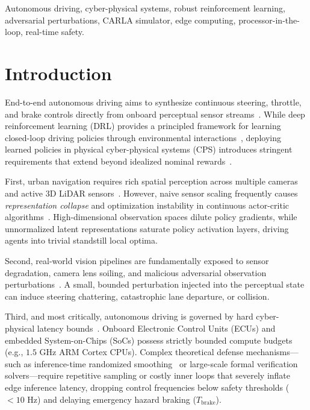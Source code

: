 \documentclass[conference]{IEEEtran}
\begin{document}
\begin{IEEEkeywords}
Autonomous driving, cyber-physical systems, robust reinforcement learning, adversarial perturbations, CARLA simulator, edge computing, processor-in-the-loop, real-time safety.
\end{IEEEkeywords}

\section{Introduction}

End-to-end autonomous driving aims to synthesize continuous steering, throttle, and brake controls directly from onboard perceptual sensor streams~\cite{pomerleau1988, bojarski2016, codevilla2018}. While deep reinforcement learning (DRL) provides a principled framework for learning closed-loop driving policies through environmental interactions~\cite{carla2017, toromanoff2020}, deploying learned policies in physical cyber-physical systems (CPS) introduces stringent requirements that extend beyond idealized nominal rewards~\cite{he2024trustworthy}.

First, urban navigation requires rich spatial perception across multiple cameras and active 3D LiDAR sensors~\cite{transfuser2021, interfuser2022}. However, naive sensor scaling frequently causes \textit{representation collapse} and optimization instability in continuous actor-critic algorithms~\cite{schulman2017}. High-dimensional observation spaces dilute policy gradients, while unnormalized latent representations saturate policy activation layers, driving agents into trivial standstill local optima.

Second, real-world vision pipelines are fundamentally exposed to sensor degradation, camera lens soiling, and malicious adversarial observation perturbations~\cite{zhang2020sa}. A small, bounded perturbation injected into the perceptual state can induce steering chattering, catastrophic lane departure, or collision.

Third, and most critically, autonomous driving is governed by hard cyber-physical latency bounds~\cite{lin2024robust}. Onboard Electronic Control Units (ECUs) and embedded System-on-Chips (SoCs) possess strictly bounded compute budgets (e.g., $1.5\text{ GHz}$ ARM Cortex CPUs). Complex theoretical defense mechanisms---such as inference-time randomized smoothing~\cite{sun2024breaking, kumar2022certifying} or large-scale formal verification solvers---require repetitive sampling or costly inner loops that severely inflate edge inference latency, dropping control frequencies below safety thresholds ($<10\text{ Hz}$) and delaying emergency hazard braking ($T_{\text{brake}}$).
\end{document}
